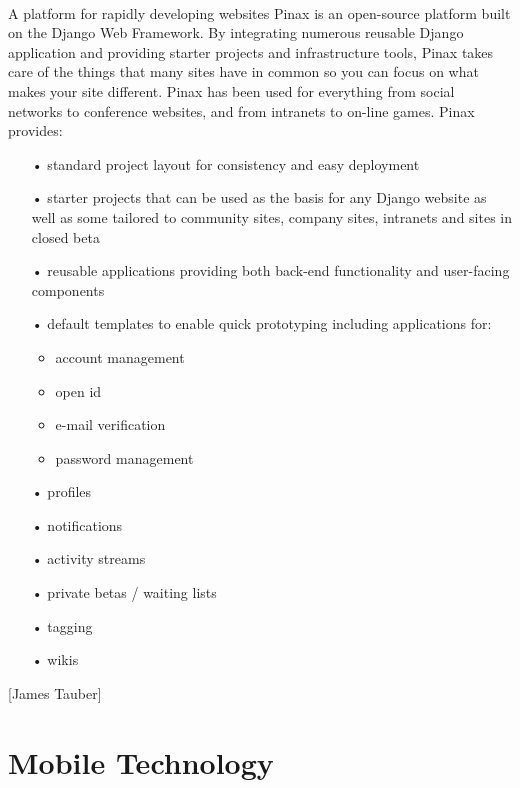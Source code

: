 \documentclass[12pt,a4paper,class,twoside,openany]{report}
\begin{document}
{\paragraph*{\hspace{.9 cm} } A platform for rapidly developing websites Pinax is an open-source platform built on the Django Web Framework. By integrating numerous reusable Django application and providing starter projects and infrastructure tools, Pinax takes care of the things that many sites have in common so you can focus on what makes your site different. Pinax has been used for everything from social networks to conference websites, and from intranets to on-line games. Pinax provides:
\begin{itemize}
\item[•]	standard project layout for consistency and easy deployment
\item[•]	starter projects that can be used as the basis for any Django website as well as some tailored to community sites, company sites, intranets and sites in closed beta 
\item[•]	reusable applications providing both back-end functionality and user-facing components
\item[•]	default templates to enable quick prototyping
including applications for:
\begin{itemize}
\item	account management
\item	open id
\item	e-mail verification
\item	password management
\end{itemize}
\item[•]	profiles
\item[•]	notifications
\item[•]	activity streams
\item[•]	private betas / waiting lists
\item[•]	tagging
\item[•]	wikis
\end{itemize}
[James Tauber]
\newpage

 \section{Mobile Technology}
}
\end{document}
